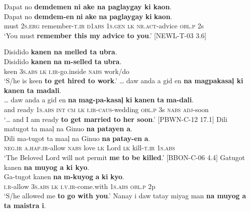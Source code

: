 \ea
Dapat  no  \textbf{demdemen  ni  ake  na  paglaygay  ki  kaon}. \smallskip\\
\gll Dapat  no  \textbf{demdem-en}  \textbf{ni}  \textbf{ake}  \textbf{na}  \textbf{paglaygay}  \textbf{ki}  \textbf{kaon}.\\
must  2\textsc{s.erg}  remember-\textsc{t.ir}  \textsc{d}1\textsc{abs}  1\textsc{s.gen}  \textsc{lk}  \textsc{nr.act}-advice  \textsc{obl.p}  2s\\
\glt ‘You must \textbf{remember this my advice to you}.’ [NEWL-T-03 3.6]
\z

\ea
Disidido  \textbf{kanen  na  melled  ta  ubra}. \smallskip\\
\gll Disidido  \textbf{kanen}  \textbf{na}  \textbf{m-selled}  \textbf{ta}  \textbf{ubra}. \\
keen  3\textsc{s.abs}  \textsc{lk}  \textsc{i.ir}-go.inside  \textsc{nabs}  work/do \\
\glt ‘S/he is keen \textbf{to get hired to work}.’
\z
\ea
… daw  anda  a  gid  en  \textbf{na  magpakasaļ  ki  kanen  ta  madali}. \smallskip\\
\gll … daw  anda  a  gid  en  \textbf{na}  \textbf{mag-pa-kasaļ}  \textbf{ki}  \textbf{kanen}  \textbf{ta}  \textbf{ma-dali}. \\
{} and  ready  1\textsc{s.abs}  \textsc{int}  \textsc{cm}  \textsc{lk}  \textsc{i.ir}-\textsc{caus}-wedding  \textsc{obl.p}  3s  \textsc{nabs}  \textsc{adj}-soon \\
\glt ‘… and I am ready \textbf{to get married to her soon}.’ [PBWN-C-12 17.1]
\z
\ea
Dili  matugot  ta  maaļ  na  Ginuo  \textbf{na  patayen  a}. \smallskip\\
\gll Dili  ma-tugot  ta  maaļ  na  Ginuo  \textbf{na}  \textbf{patay-en}  \textbf{a}. \\
\textsc{neg.ir}  \textsc{a.hap.ir}-allow  \textsc{nabs}  love  \textsc{lk}  Lord  \textsc{lk}  kill-\textsc{t.ir}  1\textsc{s.abs} \\
\glt ‘The Beloved Lord will not permit \textbf{me to be killed}.’ [BBON-C-06 4.4]
\z
\ea
Gatugot  kanen  \textbf{na  muyog  a  ki  kyo}. \smallskip\\
\gll Ga-tugot  kanen  \textbf{na}  \textbf{m-kuyog}  \textbf{a}  \textbf{ki}  \textbf{kyo}. \\
\textsc{i.r}-allow  3\textsc{s.abs}  \textsc{lk}  \textsc{i.v.ir}-come.with  1\textsc{s.abs}  \textsc{obl.p}  2p \\
\glt ‘S/he allowed me \textbf{to go with you}.’
\z
\ea
Nanay  i  daw  tatay  miyag  man  \textbf{na  muyog  a  ta  maistra  i}. \smallskip\\
